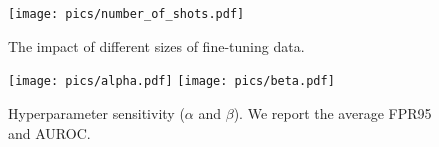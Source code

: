 \begin{figure}
    \centering
    \texttt{[image: pics/number\_of\_shots.pdf]}
    \vspace{-3em}
    \caption{The impact of different sizes of fine-tuning data.}
    \label{fig: ab: shots}
\end{figure}

\begin{figure}
    \centering
    \texttt{[image: pics/alpha.pdf]}
    \vspace{-1.5em}
    \texttt{[image: pics/beta.pdf]}
    \vspace{-0.7em}
    \caption{Hyperparameter sensitivity ($\alpha$ and $\beta$). We report the average FPR95 and AUROC.}
    \label{fig: ab: alpha}
\end{figure}

